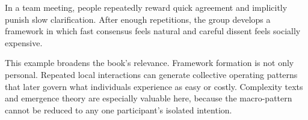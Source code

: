 \begin{example}
In a team meeting, people repeatedly reward quick agreement and implicitly
punish slow clarification. After enough repetitions, the group develops a
framework in which fast consensus feels natural and careful dissent feels
socially expensive.
\end{example}

\begin{discussion}
This example broadens the book's relevance. Framework formation is not only
personal. Repeated local interactions can generate collective operating
patterns that later govern what individuals experience as easy or costly.
Complexity texts and emergence theory are especially valuable here, because the
macro-pattern cannot be reduced to any one participant's isolated intention.
\end{discussion}
